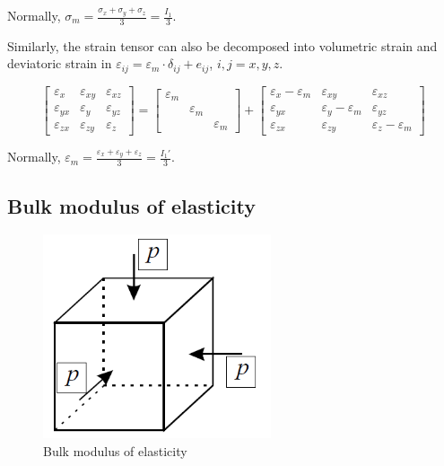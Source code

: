 \documentclass[en,hazy,cyan,8pt,normal]{elegantnote}
\numberwithin{equation}{section}
\begin{document}
    Normally, $\displaystyle \sigma_m = \frac{\sigma_x + \sigma_y + \sigma_z}{3} = \frac{I_1}{3}$.

    Similarly, the strain tensor can also be decomposed into volumetric strain and deviatoric strain in $\varepsilon_{ij} = \varepsilon_m \cdot \delta_{ij} + e_{ij}$, $i,j =x,y,z$.

    \begin{equation}\label{eq:066}
      \begin{bmatrix}
        \varepsilon_x & \varepsilon_{xy} & \varepsilon_{xz} \\
        \varepsilon_{yx} & \varepsilon_y & \varepsilon_{yz} \\
        \varepsilon_{zx} & \varepsilon_{zy} & \varepsilon_z
      \end{bmatrix}
      =
      \begin{bmatrix}
        \varepsilon_m & & \\
        & \varepsilon_m & \\
        & & \varepsilon_m
      \end{bmatrix}
      +
      \begin{bmatrix}
        \varepsilon_x - \varepsilon_m & \varepsilon_{xy} & \varepsilon_{xz} \\
        \varepsilon_{yx} & \varepsilon_y - \varepsilon_m & \varepsilon_{yz} \\
        \varepsilon_{zx} & \varepsilon_{zy} & \varepsilon_z - \varepsilon_m
      \end{bmatrix}
    \end{equation}

    Normally, $\displaystyle \varepsilon_m = \frac{\varepsilon_x + \varepsilon_y + \varepsilon_z}{3} = \frac{I_1'}{3}$.

  \subsection{Bulk modulus of elasticity}\label{subsec:03.06}

    \begin{figure}[H]
      \centering
      \includegraphics[width=0.6\textwidth]{image/019.png}
      \caption{Bulk modulus of elasticity}
      \label{fig:019}
    \end{figure}
\end{document}
